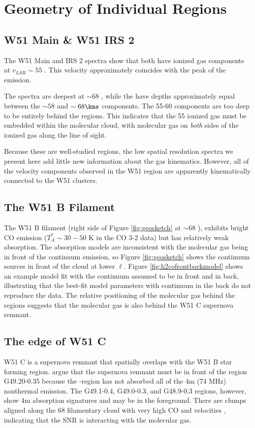 \section{Geometry of Individual Regions}
\label{appendix:geometry}
\subsection{W51 Main \& W51 IRS 2}
The W51 Main and IRS 2 spectra show that both have ionized gas components at
$v_{LSR}\sim 55$ \kms.  This velocity approximately coincides with the peak of
the \thirteenco emission.

The \formaldehyde \oneone spectra are deepest at $\sim68$ \kms, while the
\twotwo have depths approximately equal between the $\sim58$ \kms and $\sim 68
\kms$ components.  The 55-60 \kms components are too deep to be entirely behind
the \hii regions.  This indicates that the 55 \kms ionized gas must be embedded
within the molecular cloud, with molecular gas on \emph{both} sides of the
ionized gas along the line of sight.

Because these are well-studied regions, the low spatial resolution
\formaldehyde spectra we present here add little new information about the gas
kinematics.  However, all of the velocity components observed in the W51 region
are apparently kinematically connected to the W51 clusters.

\subsection{The W51 B Filament}
\label{sec:w51b}
The W51 B filament (right side of Figure \ref{fig:geosketch} at $\sim68$ \kms),
exhibits bright CO emission ($T_A^*\sim30-50$ K in the \citet{Parsons2012a} CO
3-2 data) but has relatively weak \formaldehyde absorption.
The absorption models are inconsistent with the molecular gas being in front of
the continuum emission, so Figure \ref{fig:geosketch} shows the continuum sources
in front of the cloud at lower $\ell$.  Figure \ref{fig:h2cofrontbackmodel}
shows an example model fit with the continuum assumed to be in front and in
back, illustrating that the best-fit model parameters with continuum in the
back do not reproduce the data.
The relative positioning of the molecular gas behind the \hii regions suggests
that the molecular gas is also behind the W51 C supernova remnant.

\subsection{The edge of W51 C}
W51 C is a supernova remnant that spatially overlaps with the W51 B star
forming region.  \citet{Brogan2013a} argue that the supernova remnant must be
in front of the \hii region G49.20-0.35 because the \hii-region has not absorbed
all of the 4m (74 MHz) nonthermal emission.  The G49.1-0.4, G49.0-0.3, and G48.9-0.3
regions, however, show 4m absorption signatures and may be in the foreground.
There are clumps aligned along the 68 \kms filamentary cloud with very high CO
and \hi velocities \citep{Koo1997b,Koo1997c,Brogan2013a}, indicating that the
SNR is interacting with the molecular gas.

